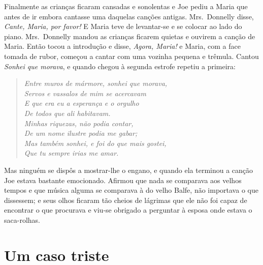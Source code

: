 Finalmente as crianças ficaram cansadas e sonolentas e Joe pediu a Maria que
antes de ir embora cantasse uma daquelas canções antigas.  Mrs.~Donnelly
disse, \textit{Cante, Maria, por favor!}  E Maria teve de levantar-se e se
colocar ao lado do piano.  Mrs.~Donnelly mandou as crianças ficarem quietas e
ouvirem a canção de Maria.  Então tocou a introdução e disse, \textit{Agora,
Maria!} e Maria, com a face tomada de rubor, começou a cantar com uma vozinha
pequena e trêmula.  Cantou \textit{Sonhei que morava}, e quando chegou à
segunda estrofe repetiu a primeira:

\begin{verse}\itshape
Entre muros de mármore, sonhei que morava,\\
Servos e vassalos de mim se acercavam\\
E que era eu a esperança e o orgulho\\
De todos que ali habitavam.\\
Minhas riquezas, não podia contar,\\
De um nome ilustre podia me gabar;\\
Mas também sonhei, e foi do que mais gostei,\\
Que tu sempre irias me amar.
\end{verse}

Mas ninguém se dispôs a mostrar-lhe o engano, e quando ela terminou a canção
Joe estava bastante emocionado.  Afirmou que nada se comparava aos velhos
tempos e que música alguma se comparava à do velho Balfe, não importava o que
dissessem; e seus olhos ficaram tão cheios de lágrimas que ele não foi capaz de
encontrar o que procurava e viu-se obrigado a perguntar à esposa onde estava o
saca-rolhas.


\chapter{Um caso triste}

